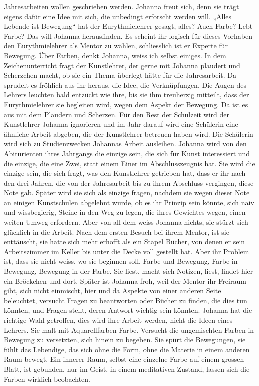 Jahresarbeiten wollen geschrieben werden. Johanna freut sich, denn sie trägt eigens dafür eine Idee mit sich, die unbedingt erforscht werden will. „Alles Lebende ist Bewegung“ hat der Eurythmielehrer gesagt, alles? Auch Farbe? Lebt Farbe? Das will Johanna herausfinden.
Es scheint ihr logisch für dieses Vorhaben den Eurythmielehrer als Mentor zu wählen, schliesslich ist er Experte für Bewegung. Über Farben, denkt Johanna, weiss ich selbst einiges.  
In dem Zeichenunterricht fragt der Kunstlehrer, der gerne mit Johanna plaudert und Scherzchen macht, ob sie ein Thema überlegt hätte für die Jahresarbeit. Da sprudelt es fröhlich aus ihr heraus, die Idee, die Verknüpfungen. Die Augen des Lehrers leuchten bald entzückt wie ihre, bis sie ihm treuherzig mitteilt, dass der Eurythmielehrer sie begleiten wird, wegen dem Aspekt der Bewegung. Da ist es aus mit dem Plaudern und Scherzen. Für den Rest der Schulzeit wird der Kunstlehrer Johanna ignorieren und im Jahr darauf wird eine Schülerin eine ähnliche Arbeit abgeben, die der Kunstlehrer betreuen haben wird. Die Schülerin wird sich zu Studienzwecken Johannas Arbeit ausleihen.
Johanna wird von den Abiturienten ihres Jahrgangs die einzige sein, die sich für Kunst interessiert und die einzige, die eine Zwei, statt einem Einer im Abschlusszeugnis hat. Sie wird die einzige sein, die sich fragt, was den Kunstlehrer getrieben hat, dass er ihr nach den drei Jahren, die von der Jahresarbeit bis zu ihrem Abschluss vergingen, diese Note gab. Später wird sie sich als einzige fragen, nachdem sie wegen dieser Note an einigen Kunstschulen abgelehnt wurde, ob es ihr Prinzip sein könnte, sich naiv und wissbegierig, Steine in den Weg zu legen, die ihres Gewichtes wegen, einen weiten Umweg erfordern.
Aber von all dem weiss Johanna nichts, sie stürzt sich glücklich in die Arbeit. Nach dem ersten Besuch bei ihrem Mentor, ist sie enttäuscht, sie hatte sich mehr erhofft als ein Stapel Bücher, von denen er sein Arbeitszimmer im Keller bis unter die Decke voll gestellt hat. Aber ihr Problem ist, dass sie nicht weiss, wo sie beginnen soll. Farbe und Bewegung, Farbe in Bewegung, Bewegung in der Farbe. Sie liest, macht sich Notizen, liest, findet hier ein Bröckchen und dort. Später ist Johanna froh, weil der Mentor ihr Freiraum gibt, sich nicht einmischt, hier und da Aspekte von einer anderen Seite beleuchtet, versucht Fragen zu beantworten oder Bücher zu finden, die dies tun könnten, und Fragen stellt, deren Antwort wichtig sein könnten. Johanna hat die richtige Wahl getroffen, dies wird ihre Arbeit werden, nicht die Ideen eines Lehrers.
Sie malt mit Aquarellfarben Farbe. Versucht die ungemischten Farben in Bewegung zu versetzten, sich hinein zu begeben. Sie spürt die Bewegungen, sie fühlt das Lebendige, das sich ohne die Form, ohne die Materie in einem anderen Raum bewegt. Ein innerer Raum, selbst eine einzelne Farbe auf einem grossen Blatt, ist gebunden, nur im Geist, in einem meditativen Zustand, lassen sich die Farben wirklich beobachten.
